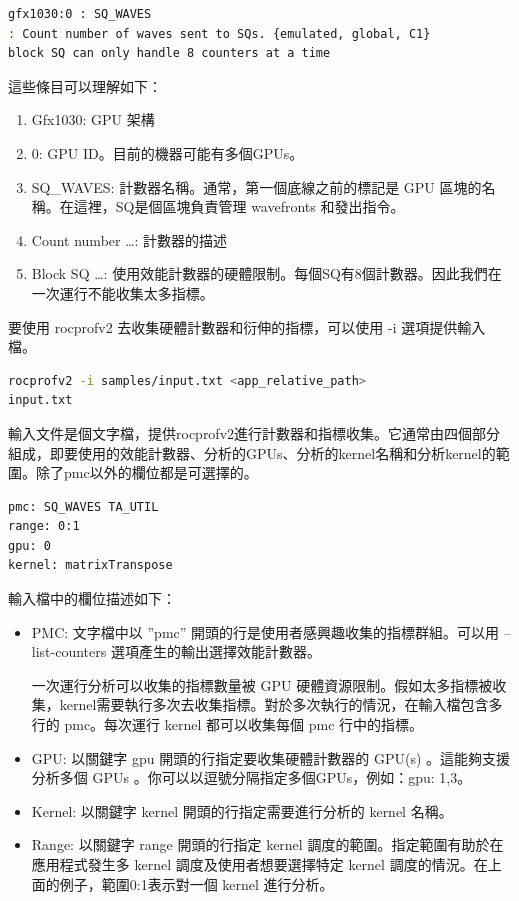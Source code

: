\begin{lstlisting}[language=bash, caption={rocprofv2計數器的範例}, label={lst:rocprofv2 counter}]
gfx1030:0 : SQ_WAVES
: Count number of waves sent to SQs. {emulated, global, C1}
block SQ can only handle 8 counters at a time
\end{lstlisting}

這些條目可以理解如下：
\begin{enumerate}
    \item Gfx1030: GPU 架構
    \item 0: GPU ID。目前的機器可能有多個GPUs。
    \item SQ\_WAVES: 計數器名稱。通常，第一個底線之前的標記是 GPU 區塊的名稱。在這裡，SQ是個區塊負責管理 wavefronts 和發出指令。
    \item Count number …: 計數器的描述
    \item Block SQ …: 使用效能計數器的硬體限制。每個SQ有8個計數器。因此我們在一次運行不能收集太多指標。
\end{enumerate}

要使用 rocprofv2 去收集硬體計數器和衍伸的指標，可以使用 -i 選項提供輸入檔。

\begin{lstlisting}[language=bash, caption={使用rocprofv2分析kernel的指令}, label={lst:profile kernels with rocprofv2}]
rocprofv2 -i samples/input.txt <app_relative_path>
input.txt
\end{lstlisting}

輸入文件是個文字檔，提供rocprofv2進行計數器和指標收集。它通常由四個部分組成，即要使用的效能計數器、分析的GPUs、分析的kernel名稱和分析kernel的範圍。除了pmc以外的欄位都是可選擇的。

\begin{lstlisting}[language=bash, caption={rocprofv2kernel分析功能的輸入檔}, label={lst:Input file for kernel profiling feature of rocprofv2}]
pmc: SQ_WAVES TA_UTIL
range: 0:1
gpu: 0
kernel: matrixTranspose
\end{lstlisting}

輸入檔中的欄位描述如下：
\begin{itemize}
    \item PMC: 文字檔中以 ”pmc” 開頭的行是使用者感興趣收集的指標群組。可以用 –list-counters 選項產生的輸出選擇效能計數器。

    一次運行分析可以收集的指標數量被 GPU 硬體資源限制。假如太多指標被收集，kernel需要執行多次去收集指標。對於多次執行的情況，在輸入檔包含多行的 pmc。每次運行 kernel 都可以收集每個 pmc 行中的指標。
    \item GPU: 以關鍵字 gpu 開頭的行指定要收集硬體計數器的 GPU(s) 。這能夠支援分析多個 GPUs 。你可以以逗號分隔指定多個GPUs，例如：gpu: 1,3。
    \item Kernel: 以關鍵字 kernel 開頭的行指定需要進行分析的 kernel 名稱。
    \item Range:  以關鍵字 range 開頭的行指定 kernel 調度的範圍。指定範圍有助於在應用程式發生多 kernel 調度及使用者想要選擇特定 kernel 調度的情況。在上面的例子，範圍0:1表示對一個 kernel 進行分析。
\end{itemize}

